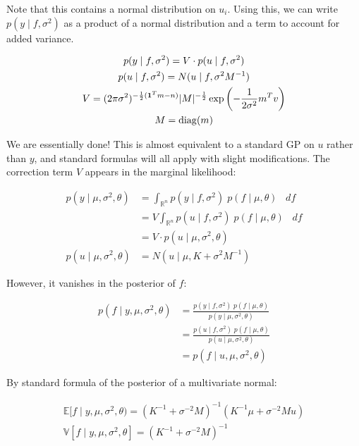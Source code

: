 \documentclass{article}
\newcommand{\dif}{\mathop{}\!{d}}
\newcommand{\one}{\mathbf{1}}
\newcommand{\real}{\mathbb{R}}
\DeclareMathOperator{\diag}{diag}
\DeclarePairedDelimiter{\Det}{\lvert}{\rvert}
\begin{document}
Note that this contains a normal distribution on $u_i$.
Using this, we can write $p(y \mid f, \sigma^2)$ as a product of a normal distribution and a term to account for added variance.

\begin{gather}
    p(y \mid f, \sigma^2) = V \cdot p(u \mid f, \sigma^2)
    \\
    p(u \mid f, \sigma^2) = N(u \mid f, \sigma^2 M^{-1})
    \\
    V = (2 \pi \sigma^2)^{-\frac{1}{2}(\one^T m - n)} \Det{M}^{-\frac{1}{2}} \exp\left(-\frac{1}{2\sigma^2} m^T v\right)
    \\
    M = \diag(m)
\end{gather}

We are essentially done!
This is almost equivalent to a standard GP on $u$ rather than $y$, and standard formulas will all apply with slight modifications.
The correction term $V$ appears in the marginal likelihood:

\begin{align}
    p(y \mid \mu, \sigma^2, \theta)
    &=
    \int_{\real^n} p(y \mid f, \sigma^2) \; p(f \mid \mu, \theta) \; \dif f
    \\ &=
    V \int_{\real^n} p(u \mid f, \sigma^2) \; p(f \mid \mu, \theta) \; \dif f
    \\ &=
    V \cdot p(u \mid \mu, \sigma^2, \theta)
    \\
    p(u \mid \mu, \sigma^2, \theta)
    &=
    N(u \mid \mu, K + \sigma^2 M^{-1})
\end{align}

However, it vanishes in the posterior of $f$:

\begin{align}
    p(f \mid y, \mu, \sigma^2, \theta)
    &=
    \frac{p(y \mid f, \sigma^2) \; p(f \mid \mu, \theta)}{p(y \mid \mu, \sigma^2, \theta)}
    \\ &=
    \frac{p(u \mid f, \sigma^2) \; p(f \mid \mu, \theta)}{p(u \mid \mu, \sigma^2, \theta)}
    \\ &=
    p(f \mid u, \mu, \sigma^2, \theta)
\end{align}

By standard formula of the posterior of a multivariate normal:

\begin{gather}
    \mathbb{E}[f \mid y, \mu, \sigma^2, \theta) =
    (K^{-1} + \sigma^{-2} M)^{-1} (K^{-1} \mu + \sigma^{-2} M u)
    \\
    \mathbb{V}[f \mid y, \mu, \sigma^2, \theta] =
    (K^{-1} + \sigma^{-2} M)^{-1}
\end{gather}
\end{document}
